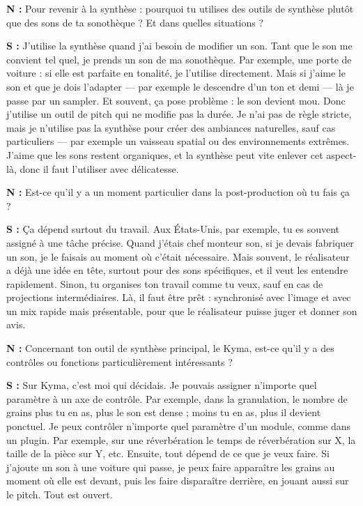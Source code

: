 ﻿\documentclass[12pt]{article}
\begin{document}
\textbf{N :} Pour revenir à la synthèse : pourquoi tu utilises des outils de synthèse plutôt que des sons de ta sonothèque ? Et dans quelles situations ?

\textbf{S :} J’utilise la synthèse quand j’ai besoin de modifier un son. Tant que le son me convient tel quel, je prends un son de ma sonothèque. Par exemple, une porte de voiture : si elle est parfaite en tonalité, je l’utilise directement.
Mais si j’aime le son et que je dois l’adapter — par exemple le descendre d’un ton et demi — là je passe par un sampler. Et souvent, ça pose problème : le son devient mou. Donc j’utilise un outil de pitch qui ne modifie pas la durée.
Je n’ai pas de règle stricte, mais je n’utilise pas la synthèse pour créer des ambiances naturelles, sauf cas particuliers — par exemple un vaisseau spatial ou des environnements extrêmes. J’aime que les sons restent organiques, et la synthèse peut vite enlever cet aspect-là, donc il faut l’utiliser avec délicatesse.

\textbf{N :} Est-ce qu’il y a un moment particulier dans la post-production où tu fais ça ?

\textbf{S :} Ça dépend surtout du travail. Aux États-Unis, par exemple, tu es souvent assigné à une tâche précise.
Quand j’étais chef monteur son, si je devais fabriquer un son, je le faisais au moment où c’était nécessaire. Mais souvent, le réalisateur a déjà une idée en tête, surtout pour des sons spécifiques, et il veut les entendre rapidement.
Sinon, tu organises ton travail comme tu veux, sauf en cas de projections intermédiaires. Là, il faut être prêt : synchronisé avec l’image et avec un mix rapide mais présentable, pour que le réalisateur puisse juger et donner son avis.

\textbf{N :} Concernant ton outil de synthèse principal, le Kyma, est-ce qu’il y a des contrôles ou fonctions particulièrement intéressants ?

\textbf{S :} Sur Kyma, c’est moi qui décidais. Je pouvais assigner n’importe quel paramètre à un axe de contrôle. Par exemple, dans la granulation, le nombre de grains plus tu en as, plus le son est dense ; moins tu en as, plus il devient ponctuel.
Je peux contrôler n’importe quel paramètre d’un module, comme dans un plugin. Par exemple, sur une réverbération le temps de réverbération sur X, la taille de la pièce sur Y, etc.
Ensuite, tout dépend de ce que je veux faire. Si j’ajoute un son à une voiture qui passe, je peux faire apparaître les grains au moment où elle est devant, puis les faire disparaître derrière, en jouant aussi sur le pitch. Tout est ouvert.
\end{document}
